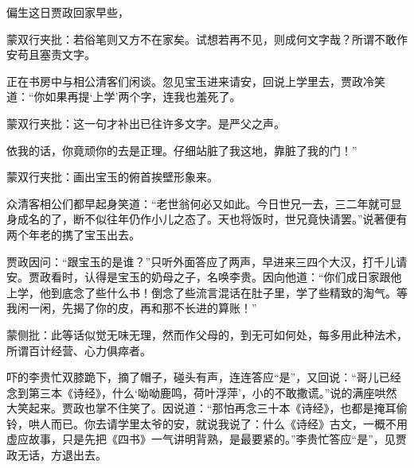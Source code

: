 \begin{parag}

    偏生这日贾政回家早些，\begin{note}蒙双行夹批：若俗笔则又方不在家矣。试想若再不见，则成何文字哉？所谓不敢作安苟且塞责文字。\end{note}正在书房中与相公清客们闲谈。忽见宝玉进来请安，回说上学里去，贾政冷笑道：“你如果再提‘上学’两个字，连我也羞死了。\begin{note}蒙双行夹批：这一句才补出已往许多文字。是严父之声。\end{note}依我的话，你竟顽你的去是正理。仔细站脏了我这地，靠脏了我的门！”\begin{note}蒙双行夹批：画出宝玉的俯首挨壁形象来。\end{note}众清客相公们都早起身笑道：“老世翁何必又如此。今日世兄一去，三二年就可显身成名的了，断不似往年仍作小儿之态了。天也将饭时，世兄竟快请罢。”说著便有两个年老的携了宝玉出去。
\end{parag}

\begin{parag}

    贾政因问：“跟宝玉的是谁？”只听外面答应了两声，早进来三四个大汉，打千儿请安。贾政看时，认得是宝玉的奶母之子，名唤李贵。因向他道：“你们成日家跟他上学，他到底念了些什么书！倒念了些流言混话在肚子里，学了些精致的淘气。等我闲一闲，先揭了你的皮，再和那不长进的算账！”\begin{note}蒙侧批：此等话似觉无味无理，然而作父母的，到无可如何处，每多用此种法术，所谓百计经营、心力俱瘁者。\end{note}吓的李贵忙双膝跪下，摘了帽子，碰头有声，连连答应“是”，又回说：“哥儿已经念到第三本《诗经》，什么‘呦呦鹿鸣，荷叶浮萍’，小的不敢撒谎。”说的满座哄然大笑起来。贾政也掌不住笑了。因说道：“那怕再念三十本《诗经》，也都是掩耳偷铃，哄人而已。你去请学里太爷的安，就说我说了：什么《诗经》古文，一概不用虚应故事，只是先把《四书》一气讲明背熟，是最要紧的。”李贵忙答应“是”，见贾政无话，方退出去。
\end{parag}



